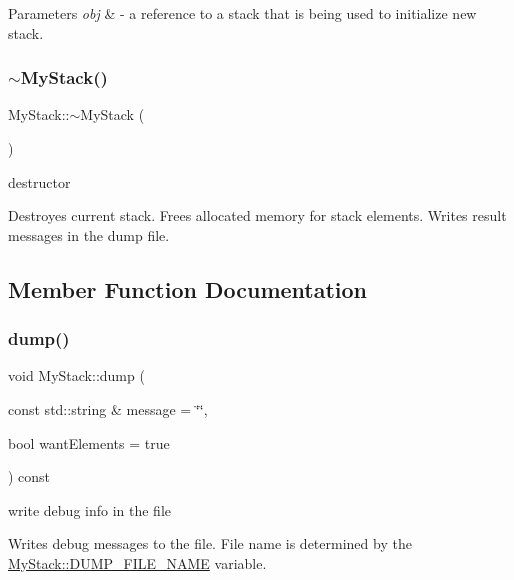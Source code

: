 \begin{DoxyParams}{Parameters}
{\em obj} & -\/ a reference to a stack that is being used to initialize new stack. \\
\hline
\end{DoxyParams}
\mbox{\label{class_my_stack_aef06833eaa332c29f0e24e6816e2715f}} 
\subsubsection{\texorpdfstring{$\sim$\+My\+Stack()}{~MyStack()}}
{\footnotesize\ttfamily My\+Stack\+::$\sim$\+My\+Stack (\begin{DoxyParamCaption}{ }\end{DoxyParamCaption})}



destructor 

Destroyes current stack. Frees allocated memory for stack elements. Writes result messages in the dump file. 

\subsection{Member Function Documentation}
\mbox{\label{class_my_stack_ac2c7329cc228ee255d98df9d9033daa3}} 
\subsubsection{\texorpdfstring{dump()}{dump()}}
{\footnotesize\ttfamily void My\+Stack\+::dump (\begin{DoxyParamCaption}\item[{const std\+::string \&}]{message = {\ttfamily \char`\"{}\char`\"{}},  }\item[{bool}]{want\+Elements = {\ttfamily true} }\end{DoxyParamCaption}) const\hspace{0.3cm}{\ttfamily [private]}}



write debug info in the file 

Writes debug messages to the file. File name is determined by the \hyperlink{class_my_stack_ab3912249fbbd11acf6f4016d3aba1b89}{My\+Stack\+::\+D\+U\+M\+P\+\_\+\+F\+I\+L\+E\+\_\+\+N\+A\+ME} variable.


